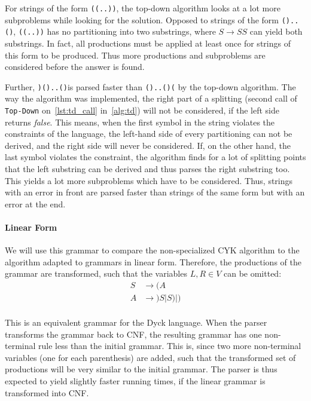 For strings of the form \texttt{((..))}, the top-down algorithm looks at a lot more subproblems while looking for the solution.
Opposed to strings of the form \texttt{()..()}, \texttt{((..))} has no partitioning into two substrings, where $S\rightarrow SS$ can yield both substrings.
In fact, all productions must be applied at least once for strings of this form to be produced.
Thus more productions and subproblems are considered before the answer is found.

Further, \texttt{)()..()}is parsed faster than \texttt{()..()(} by the top-down algorithm.
The way the algorithm was implemented, the right part of a splitting (second call of \texttt{Top-Down} on~\cref{lst:td_call} in~\cref{alg:td}) will not be considered, if the left side returns \textit{false}.
This means, when the first symbol in the string violates the constraints of the language, the left-hand side of every partitioning can not be derived, and the right side will never be considered.
If, on the other hand, the last symbol violates the constraint, the algorithm finds for a lot of splitting points that the left substring can be derived and thus parses the right substring too.
This yields a lot more subproblems which have to be considered.
Thus, strings with an error in front are parsed faster than strings of the same form but with an error at the end.


\paragraph{Linear Form}
\label{par:dyck_linear}
We will use this grammar to compare the non-specialized CYK algorithm to the algorithm adapted to grammars in linear form.
Therefore, the productions of the grammar are transformed, such that the variables $L,R\in V$ can be omitted:
\begin{align*}
    S&\rightarrow (A\\
    A&\rightarrow )S|S)|)\\
\end{align*}

This is an equivalent grammar for the Dyck language.
When the parser transforms the grammar back to CNF, the resulting grammar has one non-terminal rule less than the initial grammar.
This is, since two more non-terminal variables (one for each parenthesis) are added, such that the transformed set of productions will be very similar to the initial grammar.
The parser is thus expected to yield slightly faster running times, if the linear grammar is transformed into CNF.


